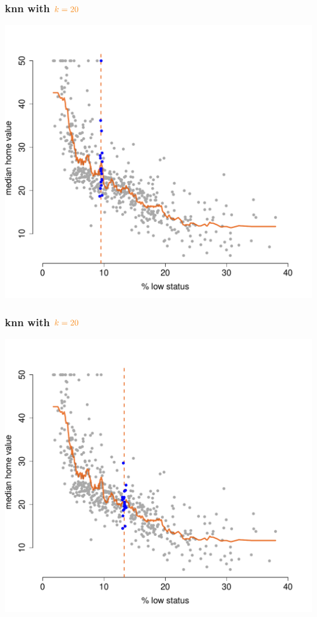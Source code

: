 \documentclass{beamer}
\newcommand{\bo}[1]{\textcolor{burntorange}{#1}}
\begin{document}
\begin{frame}[plain]
\frametitle{knn with $\bo{k=20}$}
\vspace{-8mm}
\begin{center}
\includegraphics[scale=.44]{DaveBostonplotk=20ii=3.pdf}
\end{center}
\end{frame}

\begin{frame}[plain]
\frametitle{knn with $\bo{k=20}$}
\vspace{-8mm}
\begin{center}
\includegraphics[scale=.44]{DaveBostonplotk=20ii=4.pdf}
\end{center}
\end{frame}
\end{document}
